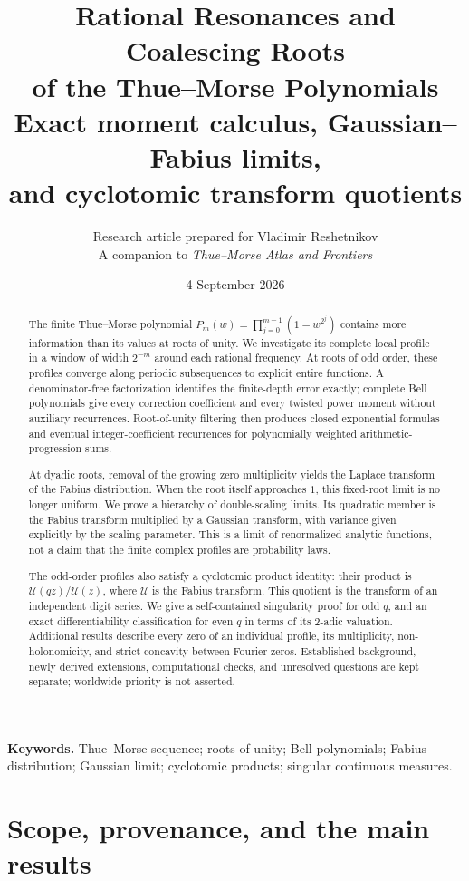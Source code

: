 \documentclass[11pt,letterpaper]{article}
\title{\textbf{Rational Resonances and Coalescing Roots\\of the Thue--Morse Polynomials}\\[0.6em]
\large Exact moment calculus, Gaussian--Fabius limits,\\and cyclotomic transform quotients}
\author{Research article prepared for Vladimir Reshetnikov\\
\small A companion to \emph{Thue--Morse Atlas and Frontiers}}
\date{4 September 2026}
\numberwithin{equation}{section}
\theoremstyle{definition}
\theoremstyle{remark}
\newcommand{\Up}{\mathcal U}
\begin{document}
\maketitle
\begin{abstract}
The finite Thue--Morse polynomial
\(P_m(w)=\prod_{j=0}^{m-1}(1-w^{2^j})\)
contains more information than its values at roots of unity. We investigate its complete local profile in a window of width \(2^{-m}\) around each rational frequency. At roots of odd order, these profiles converge along periodic subsequences to explicit entire functions. A denominator-free factorization identifies the finite-depth error exactly; complete Bell polynomials give every correction coefficient and every twisted power moment without auxiliary recurrences. Root-of-unity filtering then produces closed exponential formulas and eventual integer-coefficient recurrences for polynomially weighted arithmetic-progression sums.

At dyadic roots, removal of the growing zero multiplicity yields the Laplace transform of the Fabius distribution. When the root itself approaches \(1\), this fixed-root limit is no longer uniform. We prove a hierarchy of double-scaling limits. Its quadratic member is the Fabius transform multiplied by a Gaussian transform, with variance given explicitly by the scaling parameter. This is a limit of renormalized analytic functions, not a claim that the finite complex profiles are probability laws.

The odd-order profiles also satisfy a cyclotomic product identity: their product is \(\Up(qz)/\Up(z)\), where \(\Up\) is the Fabius transform. This quotient is the transform of an independent digit series. We give a self-contained singularity proof for odd \(q\), and an exact differentiability classification for even \(q\) in terms of its 2-adic valuation. Additional results describe every zero of an individual profile, its multiplicity, non-holonomicity, and strict concavity between Fourier zeros. Established background, newly derived extensions, computational checks, and unresolved questions are kept separate; worldwide priority is not asserted.
\end{abstract}
\vspace{0.5em}
\noindent\textbf{Keywords.} Thue--Morse sequence; roots of unity; Bell polynomials; Fabius distribution; Gaussian limit; cyclotomic products; singular continuous measures.
\clearpage
\tableofcontents
\newpage

\section{Scope, provenance, and the main results}
\label{sec:scope}
\end{document}
